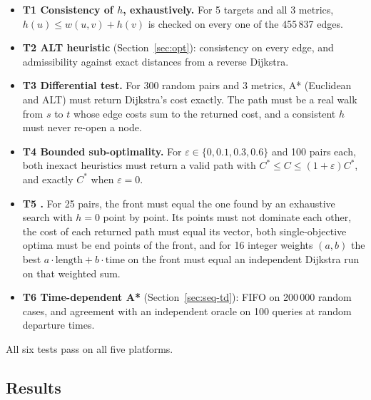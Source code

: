 \begin{itemize}[nosep]
  \item \textbf{T1 Consistency of $h$, exhaustively.} For 5 targets and all 3
        metrics, $h(u) \le w(u,v) + h(v)$ is checked on every one of the
        455\,837 edges.
  \item \textbf{T2 ALT heuristic} (Section~\ref{sec:opt}): consistency on
        every edge, and admissibility against exact distances from a
        reverse Dijkstra.
  \item \textbf{T3 Differential test.} For 300 random pairs and 3 metrics,
        A* (Euclidean and ALT) must return Dijkstra's cost exactly. The path
        must be a real walk from $s$ to $t$ whose edge costs sum to the
        returned cost, and a consistent $h$ must never re-open a node.
  \item \textbf{T4 Bounded sub-optimality.} For
        $\varepsilon\in\{0, 0.1, 0.3, 0.6\}$ and 100 pairs each, both inexact
        heuristics must return a valid path with
        $C^* \le C \le (1+\varepsilon)C^*$, and exactly $C^*$ when
        $\varepsilon=0$.
  \item \textbf{T5 \NAMOA.} For 25 pairs, the front must equal the one found
        by an exhaustive search with $h=0$ point by point. Its points must not
        dominate each other, the cost of each returned path must equal its
        vector, both single-objective optima must be end points of the front,
        and for 16 integer weights $(a,b)$ the best $a\cdot\mathrm{length} +
        b\cdot\mathrm{time}$ on the front must equal an independent Dijkstra
        run on that weighted sum.
  \item \textbf{T6 Time-dependent A*} (Section~\ref{sec:seq-td}): FIFO on
        200\,000 random cases, and agreement with an independent oracle on 100
        queries at random departure times.
\end{itemize}

All six tests pass on all five platforms.

\subsection{Results}

\begin{table}[H]
\centering
\small
\caption{Part 1: exact sequential algorithms, mean over 200 random queries.
Platforms B and C answer the same queries, so their expansion counts are
identical; Platform A uses a different query set (Section~\ref{sec:setup}).}
\label{tab:seq}

\end{table}

